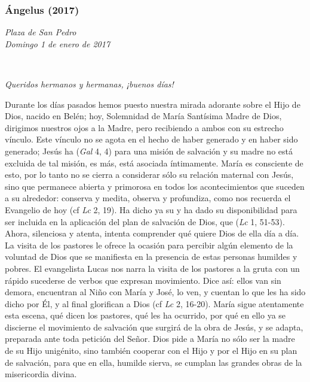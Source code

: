\subsubsection{Ángelus (2017)} \emph{Plaza de San Pedro\\ Domingo 1 de enero de 2017}

~

\emph{Queridos hermanos y hermanas, ¡buenos días!}

Durante los días pasados hemos puesto nuestra mirada adorante sobre el Hijo de Dios, nacido en Belén; hoy, Solemnidad de María Santísima Madre de Dios, dirigimos nuestros ojos a la Madre, pero recibiendo a ambos con su estrecho vínculo. Este vínculo no se agota en el hecho de haber generado y en haber sido generado; Jesús ha  (\emph{Gal} 4, 4) para una misión de salvación y su madre no está excluida de tal misión, es más, está asociada íntimamente. María es consciente de esto, por lo tanto no se cierra a considerar sólo su relación maternal con Jesús, sino que permanece abierta y primorosa en todos los acontecimientos que suceden a su alrededor: conserva y medita, observa y profundiza, como nos recuerda el Evangelio de hoy (cf \emph{Lc} 2, 19). Ha dicho ya su  y ha dado su disponibilidad para ser incluida en la aplicación del plan de salvación de Dios, que  (\emph{Lc} 1, 51-53). Ahora, silenciosa y atenta, intenta comprender qué quiere Dios de ella día a día. La visita de los pastores le ofrece la ocasión para percibir algún elemento de la voluntad de Dios que se manifiesta en la presencia de estas personas humildes y pobres. El evangelista Lucas nos narra la visita de los pastores a la gruta con un rápido sucederse de verbos que expresan movimiento. Dice así: ellos van sin demora, encuentran al Niño con María y José, lo ven, y cuentan lo que les ha sido dicho por Él, y al final glorifican a Dios (cf \emph{Lc} 2, 16-20). María sigue atentamente esta escena, qué dicen los pastores, qué les ha ocurrido, por qué en ello ya se discierne el movimiento de salvación que surgirá de la obra de Jesús, y se adapta, preparada ante toda petición del Señor. Dios pide a María no sólo ser la madre de su Hijo unigénito, sino también cooperar con el Hijo y por el Hijo en su plan de salvación, para que en ella, humilde sierva, se cumplan las grandes obras de la misericordia divina.

